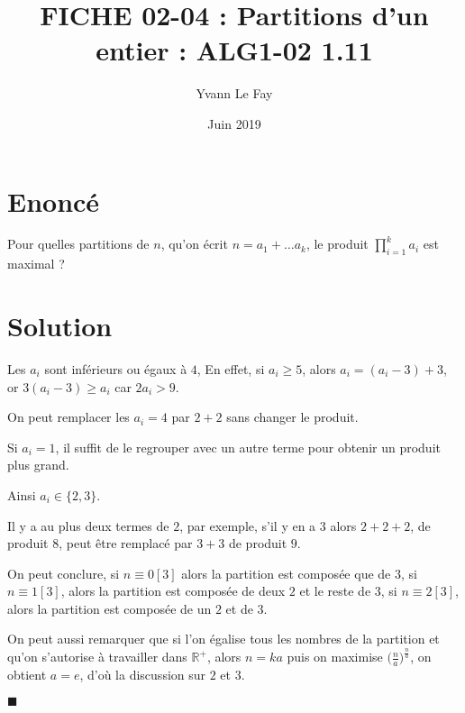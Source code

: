 \documentclass{article}
\newcommand*{\QED}{\hfill\ensuremath{\blacksquare}}%
\begin{document}
\title{FICHE 02-04 : Partitions d'un entier : ALG1-02 1.11}
\author{Yvann Le Fay}
\date{Juin 2019}
\maketitle
\section*{Enoncé}
Pour quelles partitions de $n$, qu'on écrit $n = a_1+\ldots a_k$, le produit $\prod_{i=1}^k a_i$ est maximal ?
\section*{Solution}
Les $a_i$ sont inférieurs ou égaux à $4$, En effet, si $a_i\geq 5$, alors $a_i = (a_i-3)+3$, or $3(a_i-3)\geq a_i$ car $2a_i>9$.

On peut remplacer les $a_i = 4$ par $2+2$ sans changer le produit.

Si $a_i = 1$, il suffit de le regrouper avec un autre terme pour obtenir un produit plus grand.

Ainsi $a_i \in \{2,3\}$.

Il y a au plus deux termes de $2$, par exemple, s'il y en a $3$ alors $2+2+2$, de produit $8$, peut être remplacé par $3+3$ de produit $9$.

On peut conclure, si $n\equiv 0 [3]$ alors la partition est composée que de $3$, si $n\equiv 1[3]$, alors la partition est composée de deux $2$ et le reste de $3$, si $n\equiv 2 [3]$, alors la partition est composée de un $2$ et de $3$.

On peut aussi remarquer que si l'on égalise tous les nombres de la partition et qu'on s'autorise à travailler dans $\mathbb{R}^+$, alors $n=ka$ puis on maximise $\bigg(\frac{n}{a}\bigg)^{\frac{n}{a}}$, on obtient $a=e$, d'où la discussion sur $2$ et $3$.

\QED
\end{document}
